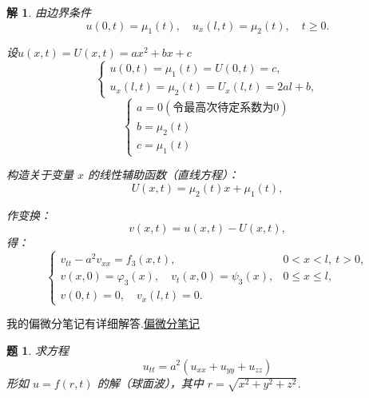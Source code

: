 \documentclass[12pt,a4paper]{article}
\newtheorem{problem}{题}
\newtheorem*{solution}{解}
\begin{document}
\begin{solution}
由边界条件
\begin{equation}
	u(0,t) = \mu_1(t), \quad u_x(l,t) = \mu_2(t), \quad t \geq 0.
\end{equation}

设$u(x, t)=U(x, t)=ax^2+bx+c$
\[
\begin{cases}
	u(0, t) = \mu_1(t) = U(0, t) = c, \\
	u_x(l, t) = \mu_2(t) = U_x(l, t) = 2al + b,
\end{cases}
\]
\[
\begin{cases}
	a = 0 (\text{令最高次待定系数为0})\\
	b =\mu_2(t) \\
	c = \mu_1(t)
\end{cases}
\]

构造关于变量 \(x\) 的线性辅助函数（直线方程）：
\begin{equation}
	U(x, t) =  \mu_2(t) x+\mu_1(t) ,
\end{equation}

作变换：
\begin{equation}
	v(x, t) = u(x, t) - U(x, t),
\end{equation}
得：
\begin{equation}
	\begin{cases}
		v_{tt} - a^2 v_{xx} = f_3(x, t), & 0 < x < l, \ t > 0, \\
		v(x, 0) = \varphi_3(x), \quad v_t(x, 0) = \psi_3(x), & 0 \leq x \leq l, \\
		v(0, t) = 0, \quad v_x(l, t) = 0. &
	\end{cases}
\end{equation}
	
\end{solution}
	我的偏微分笔记有详细解答.\href{https://github.com/Albert-Chen04/Partial-differential-equation}{偏微分笔记}
	
	
\newpage
\begin{problem}

 求方程
	\[
	u_{tt} = a^2(u_{xx} + u_{yy} + u_{zz})
	\]
	形如 $u = f(r, t)$ 的解（球面波），其中 $r = \sqrt{x^2 + y^2 + z^2}$.
	
\end{problem}
	
\end{document}

